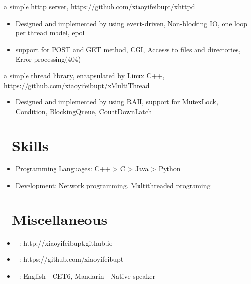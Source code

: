 \documentclass{resume}
\begin{document}
a simple htttp server, https://github.com/xiaoyifeibupt/xhttpd
\begin{itemize}
  \item Designed and implemented by using event-driven, Non-blocking IO, one loop per thread model, epoll
  \item support for POST and GET method, CGI, Accesss to files and directories, Error processing(404)
\end{itemize}

a simple thread library, encapsulated by Linux C++, https://github.com/xiaoyifeibupt/xMultiThread
\begin{itemize}
  \item Designed and implemented by using RAII, support for MutexLock, Condition, BlockingQueue, CountDownLatch
\end{itemize}

\section{\faCogs\ Skills}
\begin{itemize}[parsep=0.5ex]
  \item Programming Languages: C++ > C > Java > Python
  \item Development: Network programming, Multithreaded programing
\end{itemize}


\section{\faMapsigns\ Miscellaneous}
\begin{itemize}[parsep=0.5ex]
  \item \faHome\ : http://xiaoyifeibupt.github.io
  \item \faGithub\ : https://github.com/xiaoyifeibupt
  \item \faLanguage\ : English - CET6, Mandarin - Native speaker
\end{itemize}
\end{document}
